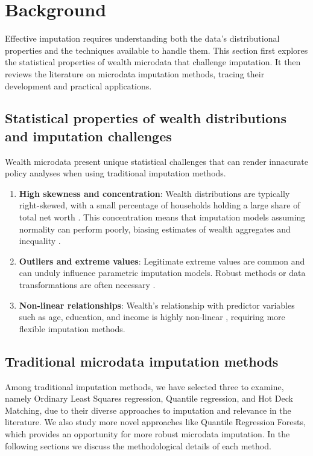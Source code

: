 \section{Background}

Effective imputation requires understanding both the data's distributional properties and the techniques available to handle them. This section first explores the statistical properties of wealth microdata that challenge imputation. It then reviews the literature on microdata imputation methods, tracing their development and practical applications.

\subsection{Statistical properties of wealth distributions and imputation challenges}

Wealth microdata present unique statistical challenges that can render innacurate policy analyses when using traditional imputation methods.

\begin{enumerate}
    \item \textbf{High skewness and concentration}: Wealth distributions are typically right-skewed, with a small percentage of households holding a large share of total net worth \citep{chen2020imputation}. This concentration means that imputation models assuming normality can perform poorly, biasing estimates of wealth aggregates and inequality \citep{lun2019multiple}.
    \item \textbf{Outliers and extreme values}: Legitimate extreme values are common and can unduly influence parametric imputation models. Robust methods or data transformations are often necessary \citep{chen2020imputation}. 
    \item \textbf{Non-linear relationships}: Wealth's relationship with predictor variables such as age, education, and income is highly non-linear \citep{zillow2024quantile}, requiring more flexible imputation methods.
\end{enumerate}

\subsection{Traditional microdata imputation methods}

Among traditional imputation methods, we have selected three to examine, namely Ordinary Least Squares regression, Quantile regression, and Hot Deck Matching, due to their diverse approaches to imputation and relevance in the literature. We also study more novel approaches like Quantile Regression Forests, which provides an opportunity for more robust microdata imputation. In the following sections we discuss the methodological details of each method. 

